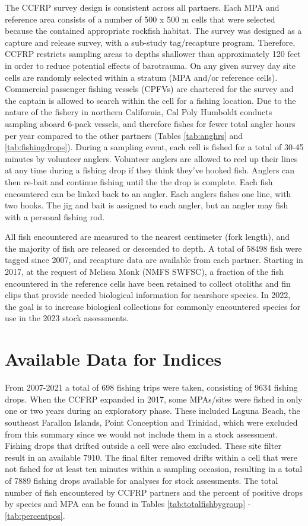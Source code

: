 \documentclass[
]{article}
\begin{document}
The CCFRP survey design is consistent across all partners. Each MPA and reference
area consists of a number of 500 x 500 m cells that were selected because the contained
appropriate rockfish habitat. The survey was designed as a capture
and release survey, with a sub-study tag/recapture program. Therefore, CCFRP restricts
sampling areas to depths shallower than approximately 120 feet in order to reduce
potential effects of barotrauma. On any given survey
day site cells are randomly selected within a stratum (MPA and/or reference cells).
Commercial passenger fishing vessels (CPFVs) are chartered for the survey and
the captain is allowed to search within the cell for a fishing location.
Due to the nature of the fishery in northern California, Cal Poly Humboldt conducts
sampling aboard 6-pack vessels, and therefore fishes for fewer total angler hours per
year compared to the other partners (Tables \ref{tab:anghrs} and \ref{tab:fishingdrops}). During
a sampling event, each cell is fished for a total of 30-45 minutes by volunteer
anglers. Volunteer anglers are allowed to reel up their lines at any time during a
fishing drop if they think they've hooked fish. Anglers can then re-bait and
continue fishing until the the drop is complete. Each fish encountered
can be linked back to an angler. Each anglers fishes one line, with two hooks.
The jig and bait is assigned to each angler, but an angler may fish with a personal
fishing rod.

All fish encountered are measured to the nearest centimeter (fork length), and the
majority of fish are released or descended to depth.
A total of 58498 fish were tagged
since 2007, and recapture data are available from each partner. Starting in 2017,
at the request of Melissa Monk (NMFS SWFSC), a fraction of the fish encountered
in the reference cells have been retained to collect otoliths and fin clips that
provide needed biological information for nearshore species. In 2022, the goal
is to increase biological collections for commonly encountered species for use
in the 2023 stock assessments.

\hypertarget{available-data-for-indices}{%
\section{Available Data for Indices}\label{available-data-for-indices}}

From 2007-2021 a total of 698 fishing trips
were taken, consisting of 9634 fishing drops. When the CCFRP
expanded in 2017, some MPAs/sites were fished in only one or two years during an
exploratory phase. These included Laguna Beach, the southeast Farallon Islands,
Point Conception and Trinidad, which were excluded from this summary since we
would not include them in a stock assessment.
Fishing drops that drifted outside a cell were also excluded. These site filter
result in an available 7910. The final filter removed
drifts within a cell that were not fished for at least ten minutes within a sampling
occasion, resulting in a total of 7889 fishing
drops available for analyses for stock assessments. The total number of fish
encountered by CCFRP partners and the percent of positive drops by species and MPA
can be found in Tables \ref{tab:totalfishbygroup} - \ref{tab:percentpos}.
\end{document}
